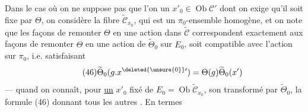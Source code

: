 Dans le cas où on ne suppose pas que l'on   un $x'_0\in\operatorname{Ob}\mathcal C'$ dont on exige qu'il soit fixe par $\Theta$, on considère la fibre  $\widetilde{\mathcal C}_{x_0}$, qui est un $\pi_0$-ensemble  homogène, et on note que les façons de remonter $\Theta$ en une action \inserted{$\widetilde\Theta$} dans $\widetilde{\mathcal C}$ correspondent  exactement aux façons de remonter $\Theta$ en une action de $\widetilde\Theta_0$ sur $E_0$,  soit compatible avec l'action sur $\pi_0$, i.e. satisfaisant
\[
\tag{46}\widetilde\Theta_0(g.x^{\deleted{\unsure{0}}\prime})=\Theta(g)\widetilde\Theta_0(x')
\]
---   quand on connaît, pour \uline{un} $x'_0$ fixé de $E_0=\operatorname{Ob}\widetilde{\mathcal C}_{x_0}$, son transformé par $\widetilde\Theta_0$, la formule (46) donnant tous les autres . En termes
